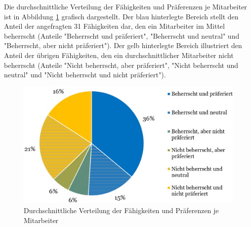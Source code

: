 Die durchschnittliche Verteilung der Fähigkeiten und Präferenzen je Mitarbeiter ist in Abbildung \ref{fig:ergebnisse:abb1} grafisch dargestellt.
Der blau hinterlegte Bereich stellt den Anteil der angefragten 31 Fähigkeiten dar, den ein Mitarbeiter im Mittel beherrscht (Anteile "Beherrscht und präferiert", "Beherrscht und neutral" und "Beherrscht, aber nicht präferiert").
Der gelb hinterlegte Bereich illustriert den Anteil der übrigen Fähigkeiten, den ein durchschnittlicher Mitarbeiter nicht beherrscht (Anteile "Nicht beherrscht, aber präferiert", "Nicht beherrscht und neutral" und "Nicht beherrscht und nicht präferiert").

\begin{figure}
    \centering
	\includegraphics[width=1.0\textwidth]{gfx/verteilung-f-p.png}
	\caption[Durchschnittliche Verteilung der Fähigkeiten und Präferenzen je Mitarbeiter]{Durchschnittliche Verteilung der Fähigkeiten und Präferenzen je Mitarbeiter}
	\label{fig:ergebnisse:abb1}
\end{figure}

